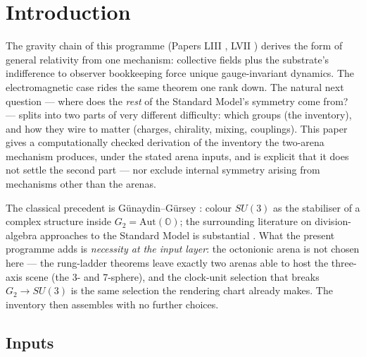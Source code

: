 \documentclass[12pt]{article}
\theoremstyle{definition}
\theoremstyle{remark}
\newcommand{\Oc}{\mathbb{O}}
\begin{document}
\section{Introduction}\label{sec:intro}

The gravity chain of this programme (Papers LIII \citep{SmartLIII}, LVII \citep{SmartLVII}) derives the form of general relativity from one mechanism: collective fields plus the substrate's indifference to observer bookkeeping force unique gauge-invariant dynamics. The electromagnetic case rides the same theorem one rank down. The natural next question --- where does the \emph{rest} of the Standard Model's symmetry come from? --- splits into two parts of very different difficulty: which groups (the inventory), and how they wire to matter (charges, chirality, mixing, couplings). This paper gives a computationally checked derivation of the inventory the two-arena mechanism produces, under the stated arena inputs, and is explicit that it does not settle the second part --- nor exclude internal symmetry arising from mechanisms other than the arenas.

The classical precedent is G\"unaydin--G\"ursey \citep{GunaydinGursey1973}: colour $SU(3)$ as the stabiliser of a complex structure inside $G_2 = \mathrm{Aut}(\Oc)$; the surrounding literature on division-algebra approaches to the Standard Model is substantial \citep{Dixon1994, Furey2016, Baez2002}. What the present programme adds is \emph{necessity at the input layer}: the octonionic arena is not chosen here --- the rung-ladder theorems leave exactly two arenas able to host the three-axis scene (the 3- and 7-sphere), and the clock-unit selection that breaks $G_2 \to SU(3)$ is the same selection the rendering chart already makes. The inventory then assembles with no further choices.

\subsection{Inputs}
\end{document}
